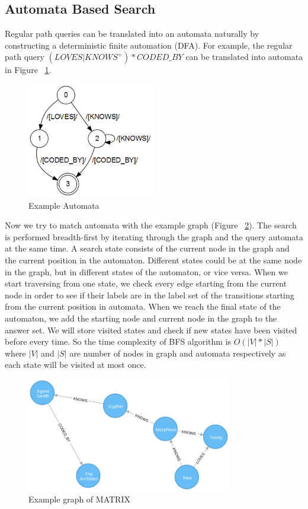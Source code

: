 \subsection{Automata Based Search}
Regular path queries can be translated into an automata naturally by constructing a deterministic finite automation (DFA). For example, the regular path query $(LOVES|KNOWS^+)*CODED\_BY$ can be translated into automata in Figure ~\ref{fig:example-automata}.
\begin{figure}[h!]
  \caption{Example Automata}
  \label{fig:example-automata}
  \centering
    \includegraphics[width=0.5\textwidth]{img/automata-example}
\end{figure}
Now we try to match automata with the example graph (Figure ~\ref{fig:example-matrix}). The search is performed breadth-first by iterating through the graph and the query automata at the same time. A search state consists of the current node in the graph and the current position in the automaton. Different states could be at the same node in the graph, but in different states of the automaton, or vice versa. When we start traversing from one state, we check every edge starting from the current node in order to see if their labels are in the label set of the transitions starting from the current position in automata. When we reach the final state of the automaton, we add the starting node and current node in the graph to the answer set. We will store visited states and check if new states have been visited before every time. So the time complexity of BFS algorithm is $O(|V|*|S|)$ where $|V|$ and $|S|$ are number of nodes in graph and automata respectively as each state will be visited at most once.\\
\begin{figure}[h!]
  \caption{Example graph of MATRIX}
  \label{fig:example-matrix}
  \centering
    \includegraphics[width=0.8\textwidth]{img/matrix-graph}
\end{figure}
